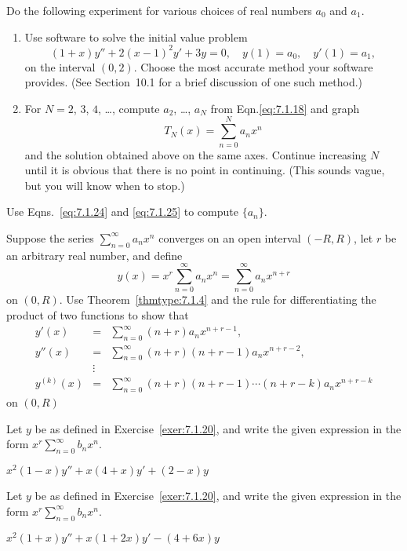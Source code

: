 \documentclass{ximera}
\begin{document}
\begin{problem}\label{exer:7.1.19}  
Do the following experiment for various choices of
real numbers  $a_0$ and $a_1$.
\begin{enumerate}
\item %
Use software  to solve the initial value problem
$$
(1+x)y''+2(x-1)^2y'+3y=0,\quad y(1)=a_0,\quad y'(1)=a_1,
$$
on the interval $(0,2)$. Choose the most accurate method
your software provides.
(See Section~10.1 for a brief discussion of one such
method.)
\item %
For $N=2$, $3$, $4$, \dots, compute $a_2$, \dots, $a_N$
from Eqn.\eqref{eq:7.1.18} and graph
$$
T_N(x)=\sum_{n=0}^N a_nx^n
$$
and the solution obtained above on the same axes.
Continue increasing $N$ until it is obvious that there is
no point in continuing.
(This sounds vague, but you will know when to stop.)
\end{enumerate}
\item Use Eqns.~\eqref{eq:7.1.24} and \eqref{eq:7.1.25}
to compute $\{a_n\}$.
\end{problem}

\begin{problem}\label{exer:7.1.20}
Suppose the series $\sum_{n=0}^\infty a_nx^n$ converges on an
open interval $(-R,R)$, let $r$ be an arbitrary real number, and
define
$$
y(x)=x^r\sum_{n=0}^\infty a_nx^n=\sum_{n=0}^\infty a_nx^{n+r}
$$
on $(0,R)$. Use Theorem~\ref{thmtype:7.1.4} and the rule for
differentiating the product of two functions to show that
\begin{eqnarray*}
y'(x)&=&\sum_{n=0}^\infty  (n+r)a_nx^{n+r-1},\\
y''(x)&=&\sum_{n=0}^\infty(n+r)(n+r-1)a_nx^{n+r-2},\\
&\vdots&\\
y^{(k)}(x)&=&\sum_{n=0}^\infty(n+r)(n+r-1)\cdots(n+r-k)a_nx^{n+r-k}
\end{eqnarray*}
on $(0,R)$
\end{problem}

\begin{problem}\label{exer:7.1.21}
Let $y$ be as defined in Exercise~\ref{exer:7.1.20}, and write the given
expression in the form $x^r\sum_{n=0}^\infty b_nx^n$.

$x^2(1-x)y''+x(4+x)y'+(2-x)y$
\end{problem}

\begin{problem}\label{exer:7.1.22}
Let $y$ be as defined in Exercise~\ref{exer:7.1.20}, and write the given
expression in the form $x^r\sum_{n=0}^\infty b_nx^n$.

$x^2(1+x)y''+x(1+2x)y'-(4+6x)y$
\end{problem}
\end{document}
